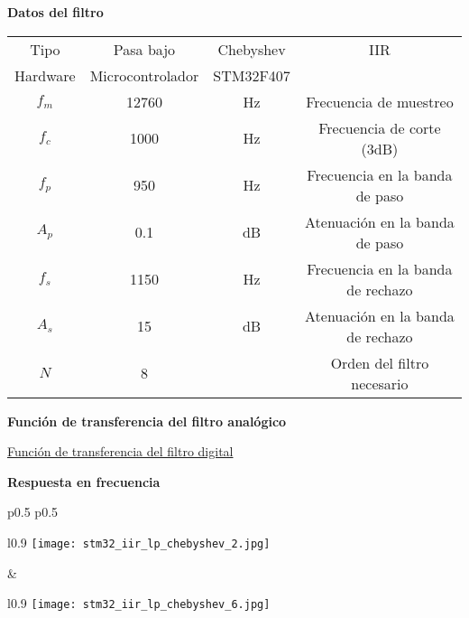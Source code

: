 \documentclass[informe.tex]{subfiles}
\begin{document}
\textbf{Datos del filtro}	\newline	
								
	\begin{tabular}{ |c | c| c| c|}
		\hline
			 Tipo     & Pasa bajo &  Chebyshev &  IIR \\
 			 Hardware & Microcontrolador & STM32F407 & \\		
			$ f_m $  & 12760  & Hz & Frecuencia de muestreo \\
			$ f_c $  & 1000   & Hz & Frecuencia de corte (3dB) \\
			$ f_p $  & 950    & Hz & Frecuencia en la banda de paso\\
			$ A_p $  & 0.1    & dB & Atenuación en la banda de paso \\			
			$ f_s $  & 1150   & Hz & Frecuencia en la banda de rechazo \\
			$ A_s $  & 15     & dB & Atenuación en la banda de rechazo \\
			$ N $   & 8      &  & Orden del filtro necesario \\			
		\hline
	\end{tabular}\newline\newline		
	
\textbf{Función de transferencia del filtro analógico}\newline
	\begin{tiny}
		
	\end{tiny}\newline
    	
    	\underline{Función de transferencia del filtro digital}\newline
	\begin{tiny}
		
	\end{tiny}\newline
	
\textbf{Respuesta en frecuencia}\newline
	\begin{tabular}{p{0.5\textwidth} p{0.5\textwidth}}		
		\begin{wrapfigure}{l}{0.9\linewidth}
    		\centering
    		\texttt{[image: stm32\_iir\_lp\_chebyshev\_2.jpg]}
    		\caption{Filtro analógico}
		\end{wrapfigure}					
		&	
	 	\begin{wrapfigure}{l}{0.9\linewidth}
    		\centering
    		\texttt{[image: stm32\_iir\_lp\_chebyshev\_6.jpg]}
    		\caption{Filtro digital}
		\end{wrapfigure}			
	 	\\ 
	\end{tabular}\newpage
	
\end{document}
